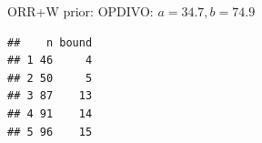 \begin{frame}[fragile]{ORR+W prior: OPDIVO: \(a=34.7, b=74.9\)}
\begin{verbatim}
##    n bound
## 1 46     4
## 2 50     5
## 3 87    13
## 4 91    14
## 5 96    15
\end{verbatim}

\begin{Shaded}
\begin{Highlighting}[]
\NormalTok{(}\NormalTok{, }\NormalTok{, }  \NormalTok{, } \NormalTok{, } \NormalTok{)}
\NormalTok{(}\NormalTok{, }\NormalTok{, }  \NormalTok{, } \NormalTok{, } \NormalTok{)}
\end{Highlighting}
\end{Shaded}

\end{frame}

